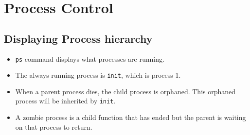 \documentclass[]{article}
\begin{document}
\section{Process Control}
\subsection{Displaying Process hierarchy}
\begin{itemize}
\item \texttt{ps} command displays what processes are running. 
\item The always running process is \texttt{init}, which is process 1.
\item When a parent process dies, the child process is orphaned. This orphaned process will be inherited by \texttt{init}.
\item A zombie process is a child function that has ended but the parent is waiting on that process to return.
\end{itemize}
\end{document}
